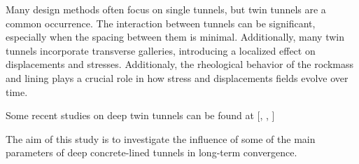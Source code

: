 \documentclass[a4paper,fleqn]{cas-sc}
\begin{document}
Many design methods often focus on single tunnels, but twin tunnels are a common occurrence. The interaction between tunnels can be significant, especially when the spacing between them is minimal. Additionally, many twin tunnels incorporate transverse galleries, introducing a localized effect on displacements and stresses. Additionaly, the rheological behavior of the rockmass and lining plays a crucial role in how stress and displacements fields evolve over time.

Some recent studies on deep twin tunnels can be found at [, , ]





The aim of this study is to investigate the influence of some of the main parameters of deep concrete-lined tunnels in long-term convergence.






\end{document}
